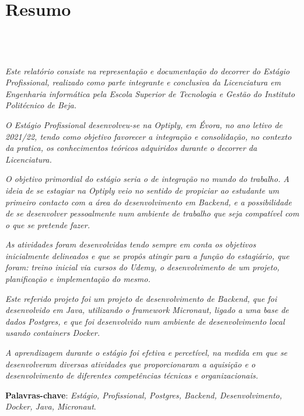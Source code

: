 \chapter{Resumo}
\section*{\textit{\TITULO}\\  {\small{\textit{\SUBTITULO}}}}

\textit{Este relatório consiste na representação e documentação do decorrer do Estágio Profissional, realizado como parte integrante e conclusiva da Licenciatura em Engenharia informática pela Escola Superior de Tecnologia e Gestão do Instituto Politécnico de Beja.}

\textit{O Estágio Profissional desenvolveu-se na Optiply, em Évora, no ano letivo de 2021/22, tendo como objetivo favorecer a integração e consolidação, no contexto da pratica, os conhecimentos teóricos adquiridos durante o decorrer da Licenciatura.}

\textit{O objetivo primordial do estágio seria o de integração no mundo do trabalho. A ideia de se estagiar na Optiply veio no sentido de propiciar ao estudante um primeiro contacto com a área do desenvolvimento em Backend, e a possibilidade de se desenvolver pessoalmente num ambiente de trabalho que seja compatível com o que se pretende fazer.}

\textit{As atividades foram desenvolvidas tendo sempre em conta os objetivos inicialmente delineados e que se propôs atingir para a função do estagiário, que foram: treino inicial via cursos do Udemy, o desenvolvimento de um projeto, planificação e implementação do mesmo.}

\textit{Este referido projeto foi um projeto de desenvolvimento de Backend, que foi desenvolvido em Java, utilizando o framework Micronaut, ligado a uma base de dados Postgres, e que foi desenvolvido num ambiente de desenvolvimento local usando containers Docker.}

\textit{A aprendizagem durante o estágio foi efetiva e percetível, na medida em que se desenvolveram diversas atividades que proporcionaram a aquisição e o desenvolvimento de diferentes competências técnicas e organizacionais.}

\textbf{Palavras-chave}: \textit{Estágio, Profissional, Postgres, Backend, Desenvolvimento, Docker, Java, Micronaut}.
